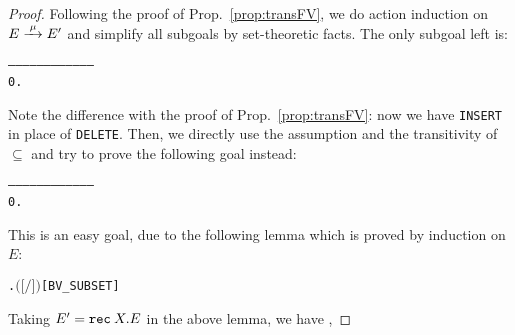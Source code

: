 \begin{proof}
Following the proof of Prop.~\ref{prop:transFV}, we do action
induction on $E \arr{\mu} E'$ and simplify all subgoals by set-theoretic
facts. The only subgoal left is:
\begin{alltt}
   ------------------------------------
    0.  
\end{alltt}
Note the difference with the proof of Prop.~\ref{prop:transFV}: now
we have \texttt{INSERT} in place of \texttt{DELETE}. Then, we directly
use the assumption and the transitivity of $\subseteq$ and try to
prove the following goal instead:
\begin{alltt}
   ------------------------------------
    0.  
\end{alltt}
This is an easy goal, due to the following lemma which is
 proved by induction on $E$:
\begin{alltt}
\HOLTokenTurnstile{} \HOLSymConst{\HOLTokenForall{}}  .  \ensuremath{(}\ensuremath{[}\ensuremath{/}\ensuremath{]} \ensuremath{)} \HOLSymConst{\HOLTokenSubset{}}   \HOLSymConst{\HOLTokenUnion{}}  \hfill{[BV_SUBSET]}
\end{alltt}
Taking $E ' = {\tt rec}\: X . E$ in the above lemma, we have
    ,

\end{proof}
